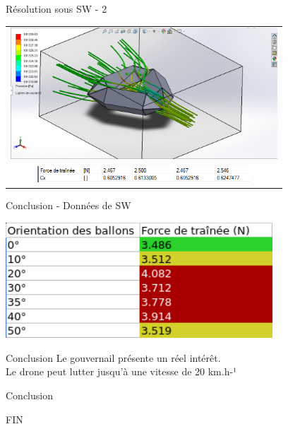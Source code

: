 \documentclass{beamer}
\begin{document}
\begin{frame}{Résolution sous SW - 2}
	\begin{center}
		\begin{tabular}{c}
      \includegraphics[width=10cm]{../Images/Capture.PNG} \\
			\includegraphics[width=8cm]{../Images/resultatsSimulationSW.png}
		\end{tabular}
	\end{center}
\end{frame}

\begin{frame}{Conclusion - Données de SW}
	\begin{center}
    \includegraphics[width=10cm]{../Images/resultatsSW.png} \\
	\end{center}
\end{frame}

\begin{frame}{Conclusion}
  Le gouvernail présente un réel intérêt.\\
  Le drone peut lutter jusqu'à une vitesse de 20 km.h-¹
\end{frame}

\begin{frame}{Conclusion}
  \begin{center}
  FIN
  \end{center}
\end{frame}
\end{document}
